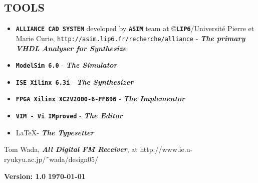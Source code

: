 \documentclass[a4paper,10pt]{article}
\begin{document}
\subsection{TOOLS}
\begin{itemize}
\item \textbf{\texttt{ALLIANCE CAD SYSTEM}} developed by \textbf{\texttt{ASIM}}
      team at \copyright \textbf{\texttt{LIP6}}/Universit\'{e} Pierre et
      Marie Curie,
      \texttt{http://asim.lip6.fr/recherche/alliance} 
      - \textbf{\textit{The primary VHDL Analyser for Synthesize}}
\item \textbf{\texttt{ModelSim 6.0}} - \textbf{\textit{The Simulator}}
\item \textbf{\texttt{ISE Xilinx 6.3i}} - \textbf{\textit{The Synthesizer}}
\item \textbf{\texttt{FPGA Xilinx XC2V2000-6-FF896}} - \textbf{\textit{The Implementor}}
\item \textbf{\texttt{VIM - Vi IMproved}} 
      - \textbf{\textit{The Editor}}
\item \LaTeX - \textbf{\textit{The Typesetter}}
\end{itemize}

\begin{thebibliography}{1}
 Tom Wada,
	\textbf{\textit{ All Digital FM Receiver}}, at
	http://www.ie.u-ryukyu.ac.jp/\~\ wada/design05/
\end{thebibliography}

\vspace{01cm}
\begin{tabbing}
\textbf{Version: 1.0}  \` \textbf{\today}
\end{tabbing}
\end{document}
